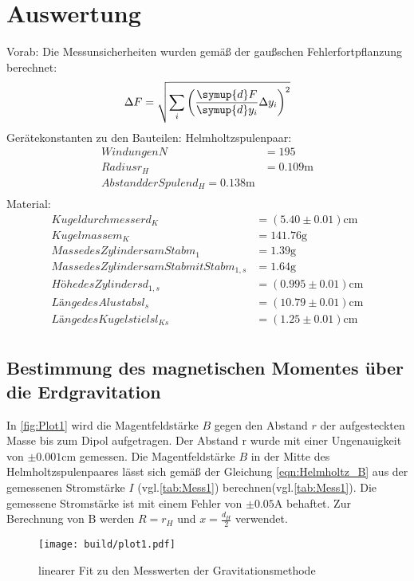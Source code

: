 \section{Auswertung}
\label{sec:Auswertung}
Vorab: Die Messunsicherheiten wurden gemäß der gaußschen Fehlerfortpflanzung berechnet:
\begin{equation}
  \label{eqn:Gauss}
  \Delta F = \sqrt{\sum_i\left(\frac{\symup{d}F}{\symup{d}y_i}\Delta y_i \right)^2}
\end{equation}
Gerätekonstanten zu den Bauteilen:
Helmholtzspulenpaar:
\begin{align*}
    Windungen N &= 195 \\
    Radius r_H &= 0.109 \unit{\metre} \\
    Abstand der Spulen d_H = 0.138 \unit{\metre} \\
\end{align*}
Material:
\begin{align*}
    Kugeldurchmesser d_K &= (5.40 \pm 0.01) \unit{\centi\metre} \\
    Kugelmasse m_K &=  141.76  \unit{\gram} \\
    Masse des Zylinders am Stab m_1 &=  1.39  \unit{\gram} \\
    Masse des Zylinders am Stab mit Stab m_{1,s} &= 1.64 \unit{\gram} \\
    Höhe des Zylinders d_{1,s} &= (0.995 \pm 0.01) \unit{\centi\metre} \\
    Länge des Alustabs l_s &= (10.79 \pm 0.01) \unit{\centi\metre} \\
    Länge des Kugelstiels l_{Ks} &= (1.25 \pm 0.01) \unit{\centi\metre} \\
\end{align*}

\subsection{Bestimmung des magnetischen Momentes über die Erdgravitation}
\label{AuswertungZu1}
In \autoref{fig:Plot1} wird die Magentfeldstärke $B$ gegen den Abstand $r$ der aufgesteckten Masse bis zum Dipol aufgetragen. Der Abstand r wurde mit einer Ungenauigkeit von $\pm 0.001\unit{\centi\metre}$ gemessen.
Die Magentfeldstärke $B$ in der Mitte des Helmholtzspulenpaares lässt sich gemäß der Gleichung \eqref{eqn:Helmholtz_B} aus der gemessenen Stromstärke $I$ (vgl.\autoref{tab:Mess1}) 
berechnen(vgl.\autoref{tab:Mess1}). Die gemessene Stromstärke ist mit einem Fehler von $\pm 0.05\unit{\ampere}$ behaftet. Zur Berechnung von B werden $R = r_H$ und $x = \frac{d_H}{2}$
verwendet.
\begin{figure}
    \centering
    \texttt{[image: build/plot1.pdf]}
    \caption{linearer Fit \cite{scipy} zu den Messwerten der Gravitationsmethode}
    \label{fig:Plot1}
\end{figure} 

